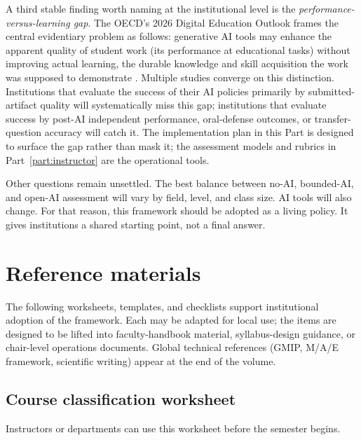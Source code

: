 \documentclass{SIAMbook2023}
\begin{document}
A third stable finding worth naming at the institutional level is the \emph{performance-versus-learning gap}. The OECD's 2026 Digital Education Outlook frames the central evidentiary problem as follows: generative AI tools may enhance the apparent quality of student work (its performance at educational tasks) without improving actual learning, the durable knowledge and skill acquisition the work was supposed to demonstrate \citep{oecd2026digital}. Multiple studies converge on this distinction. Institutions that evaluate the success of their AI policies primarily by submitted-artifact quality will systematically miss this gap; institutions that evaluate success by post-AI independent performance, oral-defense outcomes, or transfer-question accuracy will catch it. The implementation plan in this Part is designed to surface the gap rather than mask it; the assessment models and rubrics in Part~\ref{part:instructor} are the operational tools.

Other questions remain unsettled. The best balance between no-AI, bounded-AI, and open-AI assessment will vary by field, level, and class size. AI tools will also change. For that reason, this framework should be adopted as a living policy. It gives institutions a shared starting point, not a final answer.

\section{Reference materials}
\label{u:sec:part3-refs}

The following worksheets, templates, and checklists support institutional adoption of the framework. Each may be adapted for local use; the items are designed to be lifted into faculty-handbook material, syllabus-design guidance, or chair-level operations documents. Global technical references (GMIP, M/A/E framework, scientific writing) appear at the end of the volume.

\subsection{Course classification worksheet}
\label{u:app:course-classification}

Instructors or departments can use this worksheet before the semester begins.
\end{document}
